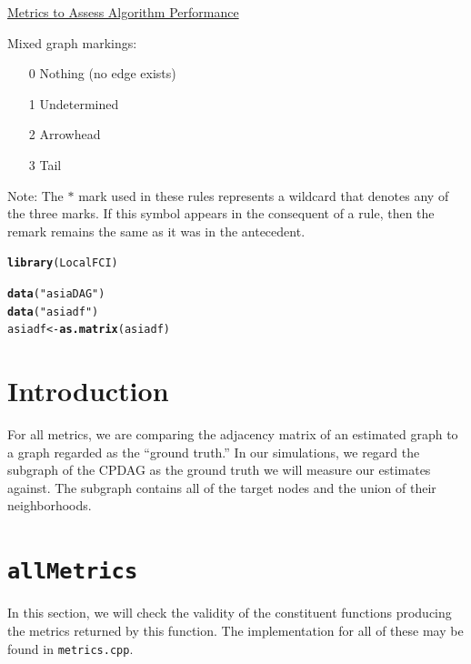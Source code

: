 \documentclass[12pt]{article}\usepackage[]{graphicx}\usepackage[]{color}
\makeatletter
\newcommand{\hlstr}[1]{\textcolor[rgb]{0.192,0.494,0.8}{#1}}%
\newcommand{\hlstd}[1]{\textcolor[rgb]{0.345,0.345,0.345}{#1}}%
\newcommand{\hlkwb}[1]{\textcolor[rgb]{0.69,0.353,0.396}{#1}}%
\newcommand{\hlkwd}[1]{\textcolor[rgb]{0.737,0.353,0.396}{\textbf{#1}}}%
\newenvironment{kframe}{%
 \def\at@end@of@kframe{}%
 \ifinner\ifhmode%
  \def\at@end@of@kframe{\end{minipage}}%
  \begin{minipage}{\columnwidth}%
 \fi\fi%
 \def\FrameCommand##1{\hskip\@totalleftmargin \hskip-\fboxsep
 \colorbox{shadecolor}{##1}\hskip-\fboxsep
     \hskip-\linewidth \hskip-\@totalleftmargin \hskip\columnwidth}%
 \MakeFramed {\advance\hsize-\width
   \@totalleftmargin\z@ \linewidth\hsize
   \@setminipage}}%
 {\par\unskip\endMakeFramed%
 \at@end@of@kframe}
\newenvironment{knitrout}{}{} %
\makeatother
\begin{document}
\begin{center}
\Large \underline{Metrics to Assess Algorithm Performance}
\end{center}

Mixed graph markings:
\begin{enumerate}
\item[0] Nothing (no edge exists)
\item[1] Undetermined 
\item[2] Arrowhead
\item[3] Tail
\end{enumerate}
Note: The $\ast$ mark used in these rules represents a wildcard that denotes any of the three marks. If this symbol appears in the consequent of a rule, then the remark remains the same as it was in the antecedent.

\begin{knitrout}
\color{fgcolor}\begin{kframe}
\begin{alltt}
\hlkwd{library}\hlstd{(LocalFCI)}
\end{alltt}


{\ttfamily\noindent\itshape\color{messagecolor}{\#\# Loading required package: bnlearn}}\begin{alltt}
\hlkwd{data}\hlstd{(}\hlstr{"asiaDAG"}\hlstd{)}
\hlkwd{data}\hlstd{(}\hlstr{"asiadf"}\hlstd{)}
\hlstd{asiadf} \hlkwb{<-} \hlkwd{as.matrix}\hlstd{(asiadf)}
\end{alltt}
\end{kframe}
\end{knitrout}

\section*{Introduction}
For all metrics, we are comparing the adjacency matrix of an estimated graph to a graph regarded as the ``ground truth.'' In our simulations, we regard the subgraph of the CPDAG as the ground truth we will measure our estimates against. The subgraph contains all of the target nodes and the union of their neighborhoods.

\section*{\texttt{allMetrics}}
In this section, we will check the validity of the constituent functions producing the metrics returned by this function. The implementation for all of these may be found in \texttt{metrics.cpp}.
\newpage
\end{document}
